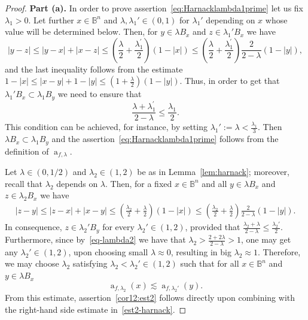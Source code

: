 \documentclass[11pt,a4paper,reqno]{amsart}
\theoremstyle{definition}
\renewcommand{\a}{\operatorname{a}}
\newcommand{\B}{\mathbb{B}^n}
\newcommand{\red}{\color{red}}
\newcounter{komcounter}
\numberwithin{komcounter}{section}
\newcommand{\komI}[1]{{\bf \red [\refstepcounter{komcounter}\thekomcounter (by I): #1]}}
\begin{document}
\begin{proof}
{\bf Part (a).} In order to prove assertion~\eqref{eq:Harnacklambda1prime} let us fix $\lambda_1 >0$. Let further $x\in \B$ and $\lambda , \lambda_1' \in (0,1)$ for $\lambda_1'$ depending on $x$ whose value will be determined below. Then, for $y\in \lambda B_x$ and $z\in \lambda_1' B_x$ we have
$$
|y-z|\leq |y-x|+|x-z|\leq \left( \frac\lambda 2 + \frac{\lambda_1^\prime}{2}\right) (1-|x|)\leq \left( \frac\lambda 2 + \frac{\lambda_1^\prime}{2}\right)\frac{2}{2-\lambda } (1-|y|),
$$
and the last inequality follows from the estimate $1-|x|\leq |x-y|+1-|y|\leq (1+\frac{\lambda}{2})(1-|y|)$.
Thus, in order to get that $\lambda_1' B_x\subset \lambda_1 B_y$ we need to ensure that
$$
\frac{\lambda + \lambda_1^\prime }{2-\lambda}\leq \frac{\lambda_1}{2}.
$$
This condition can be achieved, for instance, by setting $\lambda_1':=\lambda <\frac{\lambda_1}{3}$. Then $\lambda  B_x\subset \lambda_1 B_y$ and the assertion~\eqref{eq:Harnacklambda1prime} follows from the definition of $\a_{f,\lambda}$. 
\medskip
		
 Let  $\lambda\in (0,1/2)$ and $\lambda_2\in (1,2)$ be as in Lemma~\ref{lem:harnack}; moreover, recall that $\lambda_2$ depends on $\lambda$. Then, for a fixed $x\in \B$ and all $y\in\lambda B_x$ and $z\in \lambda_2 B_x$ we have
	\begin{align*}
		|z-y|\leq |z-x|+|x-y|\leq \left( \frac{\lambda_2}{2}+\frac{\lambda}{2}\right) (1-|x|)\leq \left( \frac{\lambda_2}{2}+\frac{\lambda}{2}\right)\frac{2}{2-\lambda}(1-|y|).
	\end{align*}
In consequence, $z\in \lambda_2' B_y$ for every $\lambda_2' \in (1,2)$, provided that $\frac{\lambda_2+\lambda}{2-\lambda}\leq\frac{\lambda_2'}{2}$. Furthermore, since by~\eqref{eq-lambda2} we have that $\lambda_2> \frac{2+2\lambda}{2-\lambda}>1$, one may get any $\lambda_2' \in (1,2)$, upon choosing small $\lambda \approx 0$, resulting in big $\lambda_2\approx 1$.
Therefore, we may choose $\lambda_2$ satisfying $\lambda_2<\lambda_2' \in (1,2)$ such that for all $x\in \B$ and $y\in \lambda B_x$ 
\begin{equation*}%
    \a_{f,\lambda_2}(x) \lesssim \a_{f,\lambda_2'}(y).
\end{equation*}
From this estimate, assertion~\eqref{cor12:est2} follows directly upon combining with the right-hand side estimate in~\eqref{est2-harnack}.
\medskip


\end{proof}
\end{document}
